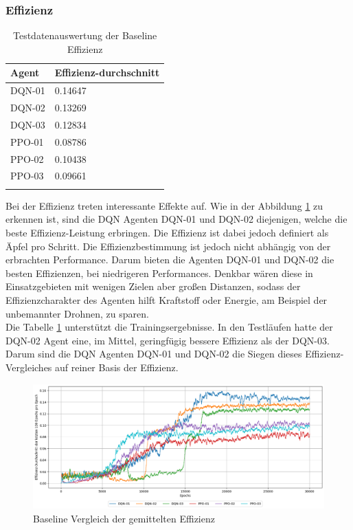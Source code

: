 \subsubsection{Effizienz}
\begin{longtable}[h]{|p{3.5cm}|p{4.0cm}|}
	\hline
	Agent & Effizienz-durchschnitt \\
	\hline
	DQN-01 & 0.14647 \\
	\hline
	DQN-02 & 0.13269 \\
	\hline
	DQN-03 & 0.12834 \\
	\hline
	PPO-01 & 0.08786 \\
	\hline
	PPO-02 & 0.10438 \\
	\hline
	PPO-03 & 0.09661 \\
	\hline
	\caption{Testdatenauswertung der Baseline Effizienz}
	\label{tab:Evaluation_Testdaten_Effizienz} 
\end{longtable}
Bei der Effizienz treten interessante Effekte auf. Wie in der Abbildung \ref{fig:Baseline_Effizienz} zu erkennen ist, sind die DQN Agenten DQN-01 und DQN-02 diejenigen, welche die beste Effizienz-Leistung erbringen. Die Effizienz ist dabei jedoch definiert als Äpfel pro Schritt. 
Die Effizienzbestimmung ist jedoch nicht abhängig von der erbrachten Performance. 
Darum bieten die Agenten DQN-01 und DQN-02 die besten Effizienzen, bei niedrigeren Performances. 
Denkbar wären diese in Einsatzgebieten mit wenigen Zielen aber großen Distanzen, sodass der Effizienzcharakter des Agenten hilft Kraftstoff oder Energie, am Beispiel der unbemannter Drohnen, zu sparen.\\
Die Tabelle \ref{tab:Evaluation_Testdaten_Effizienz} unterstützt die Trainingsergebnisse. In den Testläufen hatte der DQN-02 Agent eine, im Mittel, geringfügig bessere Effizienz als der DQN-03. Darum sind die DQN Agenten DQN-01 und DQN-02 die Siegen dieses Effizienz-Vergleiches auf reiner Basis der Effizienz.
\begin{figure}[H]
	\centering
	\includegraphics[scale=0.4517]{Abbildungen/Evaluation/effizienz-rate_baseline_01.png}
	\caption[Baseline Vergleich Effizienz]{Baseline Vergleich der gemittelten Effizienz}
	\label{fig:Baseline_Effizienz}
\end{figure}

